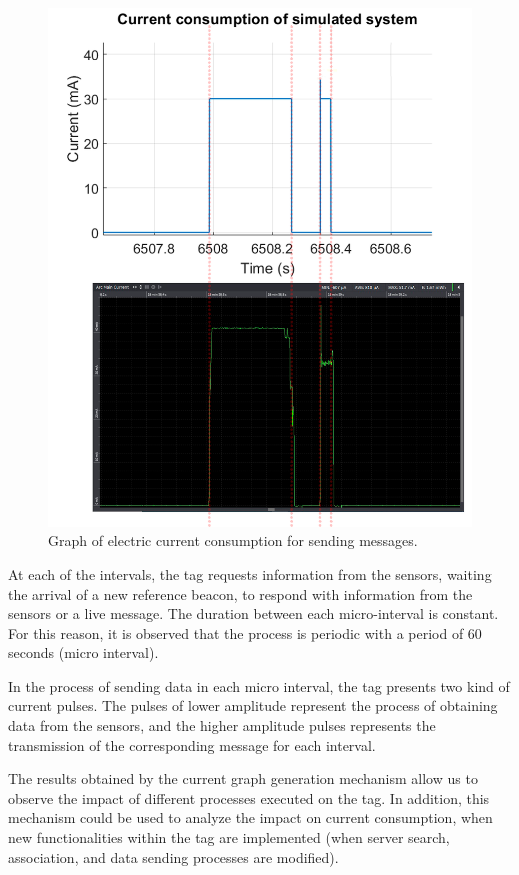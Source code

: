 \documentclass[journal]{IEEEtran}	%
\begin{document}
\begin{figure}[t!]
\centering
\includegraphics[width=0.99\columnwidth]{microIntervalsOne.png}
\caption{Graph of electric current consumption for sending messages.}
\label{fig:sendMessage}
\end{figure}

At each of the intervals, the tag requests information from the sensors, waiting the arrival of a new reference beacon, to respond with information from the sensors or a live message. The duration between each micro-interval is constant. For this reason, it is observed that the process is periodic with a period of 60 seconds (micro interval).

In the process of sending data in each micro interval, the tag presents two kind of current pulses. The pulses of lower amplitude represent the process of obtaining data from the sensors, and the higher amplitude pulses represents the transmission of the corresponding message for each interval.

The results obtained by the current graph generation mechanism allow us to observe the impact of different processes executed on the tag. In addition, this mechanism could be used to analyze the impact on current consumption, when new functionalities within the tag are implemented (when server search, association, and data sending processes are modified).
\end{document}
